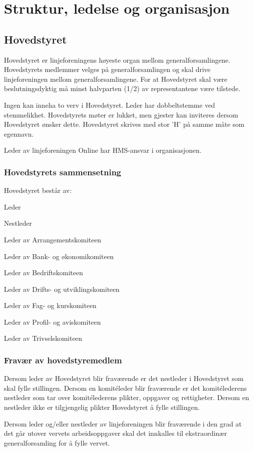 \chapter{Struktur, ledelse og organisasjon}
\section{Hovedstyret}
\vspace{23pt}

Hovedstyret er linjeforeningens høyeste organ mellom generalforsamlingene. Hovedstyrets medlemmer velges på generalforsamlingen og skal drive linjeforeningen mellom generalforsamlingene. For at Hovedstyret skal være beslutningsdyktig må minst halvparten (1/2) av representantene være tilstede.\newline

Ingen kan inneha to verv i Hovedstyret. Leder har dobbeltstemme ved stemmelikhet. Hovedstyrets møter er lukket, men gjester kan inviteres dersom Hovedstyret ønsker dette. Hovedstyret skrives med stor ’H’ på samme måte som egennavn.

Leder av linjeforeningen Online har HMS-ansvar i organisasjonen. 


\subsection{Hovedstyrets sammensetning}{
Hovedstyret består av:
\begin{liste}
	\item Leder
	\item Nestleder
	\item Leder av Arrangementskomiteen
	\item Leder av Bank- og økonomikomiteen
	\item Leder av Bedriftskomiteen
	\item Leder av Drifts- og utviklingskomiteen
	\item Leder av Fag- og kurskomiteen
	\item Leder av Profil- og aviskomiteen
	\item Leder av Trivselskomiteen
\end{liste}
}


\subsection{Fravær av hovedstyremedlem}{
Dersom leder av Hovedstyret blir fraværende er det nestleder i Hovedstyret som skal fylle stillingen. Dersom en komitéleder blir fraværende er det komitélederens nestleder som tar over komitélederens plikter, oppgaver og rettigheter. Dersom en nestleder ikke er tilgjengelig plikter Hovedstyret å fylle stillingen. 

Dersom leder og/eller nestleder av linjeforeningen blir fraværende i den grad at det går utover vervets arbeidsoppgaver skal det innkalles til ekstraordinær generalforsamling for å fylle vervet.
}
